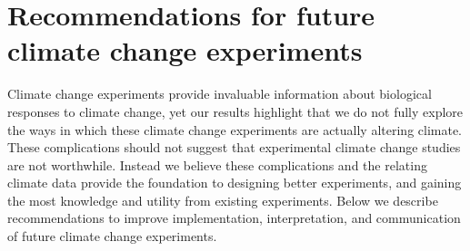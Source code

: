 \documentclass{article}
\begin{document}
\section* {Recommendations for future climate change experiments}
 \par Climate change experiments provide invaluable information about biological responses to climate change, yet our results highlight that we do not fully explore the ways in which these climate change experiments are actually altering climate. These complications should not suggest that experimental climate change studies are not worthwhile. Instead we believe these complications and the relating climate data provide the foundation to designing better experiments, and gaining the most knowledge and utility from existing experiments. Below we describe recommendations to improve implementation, interpretation, and communication of future climate change experiments.
 
\end{document}
